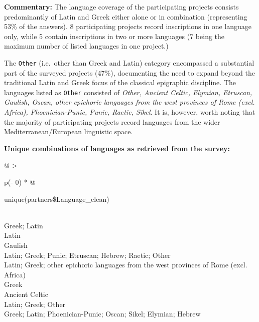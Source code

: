 \documentclass[
  12pt,
]{scrreprt}
\begin{document}
\normalsize

\footnotesize

\normalsize

\textbf{Commentary:} The language coverage of the participating projects
consists predominantly of Latin and Greek either alone or in combination
(representing 53\% of the answers). 8 participating projects record
inscriptions in one language only, while 5 contain inscriptions in two
or more languages (7 being the maximum number of listed languages in one
project.)

The \texttt{Other} (i.e.~other than Greek and Latin) category
encompassed a substantial part of the surveyed projects (47\%),
documenting the need to expand beyond the traditional Latin and Greek
focus of the classical epigraphic discipline. The languages listed as
\texttt{Other} consisted of \emph{Other, Ancient Celtic, Elymian,
Etruscan, Gaulish, Oscan, other epichoric languages from the west
provinces of Rome (excl. Africa), Phoenician-Punic, Punic, Raetic,
Sikel}. It is, however, worth noting that the majority of participating
projects record languages from the wider Mediterranean/European
linguistic space.

\textbf{Unique combinations of languages as retrieved from the survey:}

\footnotesize

\begin{longtable}[]{@{}
  >{\raggedright\arraybackslash}p{(\columnwidth - 0\tabcolsep) * }@{}}
\toprule
\begin{minipage}[b]{\linewidth}\raggedright
unique(partners\$Language\_clean)
\end{minipage} \\
\midrule
\endhead
Greek; Latin \\
Latin \\
Gaulish \\
Latin; Greek; Punic; Etruscan; Hebrew; Raetic; Other \\
Latin; Greek; other epichoric languages from the west provinces of Rome
(excl. Africa) \\
Greek \\
Ancient Celtic \\
Latin; Greek; Other \\
Greek; Latin; Phoenician-Punic; Oscan; Sikel; Elymian; Hebrew \\
\bottomrule
\end{longtable}

\normalsize
\end{document}
